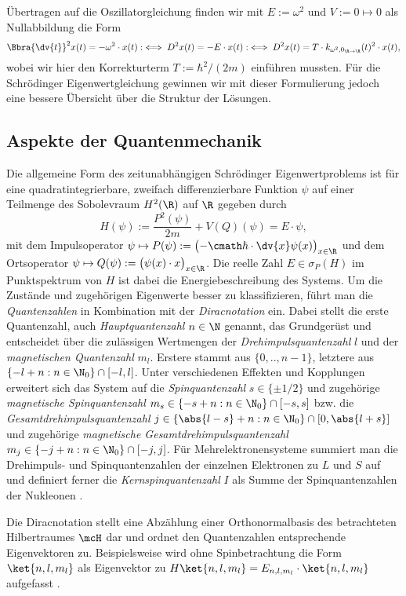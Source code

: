 \documentclass[../main.tex]{subfiles}
\begin{document}
            Übertragen auf die Oszillatorgleichung finden wir mit $E:=\omega^2$ und $V:=0\mapsto 0$ als Nullabbildung die Form
            \[
                \Bbra{\dv{t}}^2x(t) = -\omega^2\cdot x(t) :\iff D^2x(t) = -E\cdot x(t) :\iff D^2x(t) = T\cdot k_{\omega^2,0_{\R\to\R}}(t)^2\cdot x(t),
            \]
            wobei wir hier den Korrekturterm $T:=\hbar^2/(2m)$ einführen mussten. Für die Schrödinger Eigenwertgleichung gewinnen wir mit dieser Formulierung jedoch eine bessere Übersicht über die Struktur der Lösungen.

    \subsection{Aspekte der Quantenmechanik}
        Die allgemeine Form des zeitunabhängigen Schrödinger Eigenwertproblems ist für eine quadratintegrierbare, zweifach differenzierbare Funktion $\psi$ auf einer Teilmenge des Sobolevraum $H^2(\R)$ auf $\R$ gegeben durch
        \[
            H(\psi) := \frac{P^2(\psi)}{2m} + V(Q)(\psi) = E\cdot\psi,
        \]
        mit dem Impulsoperator $\psi\mapsto P(\psi):=\bigl(-\cmath\hbar\cdot\dv{x}\psi(x)\bigr)_{x\in\R}$ und dem Ortsoperator $\psi\mapsto Q(\psi):=\bigl(\psi(x)\cdot x\bigr)_{x\in\R}$. Die reelle Zahl $E\in\sigma_P(H)$ im Punktspektrum von $H$ ist dabei die Energiebeschreibung des Systems. Um die Zustände und zugehörigen Eigenwerte besser zu klassifizieren, führt man die \emph{Quantenzahlen} in Kombination mit der \emph{Diracnotation} ein. Dabei stellt die erste Quantenzahl, auch \emph{Hauptquantenzahl} $n\in\N$ genannt, das Grundgerüst und entscheidet über die zulässigen Wertmengen der \emph{Drehimpulsquantenzahl} $l$ und der \emph{magnetischen Quantenzahl} $m_l$. Erstere stammt aus $\{0,..,n-1\}$, letztere aus $\{-l + n:n\in\N_0\}\cap[-l,l]$. Unter verschiedenen Effekten und Kopplungen erweitert sich das System auf die \emph{Spinquantenzahl} $s\in\{\pm 1/2\}$ und zugehörige \emph{magnetische Spinquantenzahl} $m_s\in\{-s + n:n\in\N_0\}\cap[-s,s]$ bzw. die \emph{Gesamtdrehimpulsquantenzahl} $j\in\{\abs{l-s} + n:n\in\N_0\}\cap[0,\abs{l+s}]$ und zugehörige \emph{magnetische Gesamtdrehimpulsquantenzahl} $m_j\in\{-j + n:n\in\N_0\}\cap[-j,j]$. Für Mehrelektronensysteme summiert man die Drehimpuls- und Spinquantenzahlen der einzelnen Elektronen zu $L$ und $S$ auf und definiert ferner die \emph{Kernspinquantenzahl} $I$ als Summe der Spinquantenzahlen der Nukleonen \cite{wiki:Quantenzahl}.

        Die Diracnotation stellt eine Abzählung einer Orthonormalbasis des betrachteten Hilbertraumes $\mcH$ dar und ordnet den Quantenzahlen entsprechende Eigenvektoren zu. Beispielsweise wird ohne Spinbetrachtung die Form $\ket{n,l,m_l}$ als Eigenvektor zu $H\ket{n,l,m_l} = E_{n,l,m_l}\cdot\ket{n,l,m_l}$ aufgefasst \cite[p.48f]{git:IK4T}.
\end{document}
